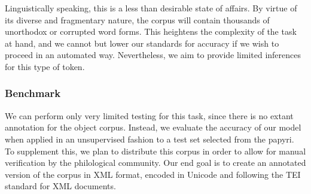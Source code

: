 Linguistically speaking, this is a less than desirable state of
affairs. By virtue of its diverse and fragmentary nature, the corpus
will contain thousands of unorthodox or corrupted word forms. This
heightens the complexity of the task at hand, and we cannot but lower
our standards for accuracy if we wish to proceed in an automated
way. Nevertheless, we aim to provide limited inferences for this type
of token.

\subsubsection{Benchmark}
We can perform only very limited testing for this task, since there is
no extant annotation for the object corpus. Instead, we evaluate the
accuracy of our model when applied in an unsupervised fashion to a
test set selected from the papyri. To supplement this, we plan to
distribute this corpus in order to allow for manual verification by
the philological community. Our end goal is to create an annotated
version of the corpus in XML format, encoded in Unicode and following
the TEI standard for XML documents.





